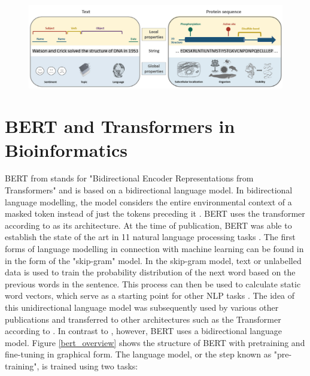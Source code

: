 \begin{figure}[h]
 \centering
 \includegraphics[width=15cm]{images/protein_representation.png}
 \caption{\citep{Ofer2021}}
 \label{protein representation}
\end{figure}

\section{BERT and Transformers in Bioinformatics}


BERT from \cite{Devlin2019} stands for "Bidirectional Encoder Representations from Transformers" and is based on a bidirectional language model. In bidirectional language modelling, the model considers the entire environmental context of a masked token instead of just the tokens preceding it \citep{Ofer2021}. BERT uses the transformer according to \cite{Vaswani2017} as its architecture. At the time of publication, BERT was able to establish the state of the art in 11 natural language processing tasks \citep{Devlin2019}. The first forms of language modelling in connection with machine learning can be found in \cite{Mikolov2013} in the form of the "skip-gram" model. In the skip-gram model, text or unlabelled data is used to train the probability distribution of the next word based on the previous words in the sentence. This process can then be used to calculate static word vectors, which serve as a starting point for other NLP tasks \citep{Mikolov2013a}. The idea of this unidirectional language model was subsequently used by various other publications and transferred to other architectures such as the Transformer according to \cite{Vaswani2017} \citep{Radford2018ImprovingLU}. In contrast to \cite{Radford2018ImprovingLU}, however, BERT uses a bidirectional language model. Figure \ref{bert_overview} shows the structure of BERT with pretraining and fine-tuning in graphical form. The language model, or the step known as "pre-training", is trained using two tasks:

